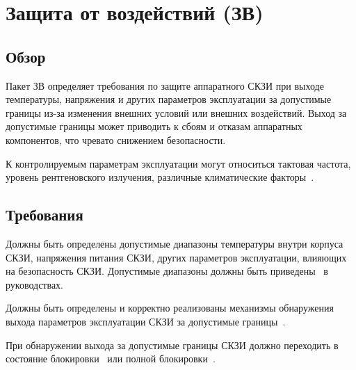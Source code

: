 \section{Защита от воздействий (ЗВ)}\label{EF}

\subsection{Обзор}\label{EF.Intro}

Пакет ЗВ определяет требования по защите аппаратного СКЗИ при выходе 
температуры, напряжения и других параметров эксплуатации за допустимые 
границы из-за изменения внешних условий или внешних воздействий.
%
Выход за допустимые границы может приводить к сбоям и отказам аппаратных 
компонентов, что чревато снижением безопасности.

К контролируемым параметрам эксплуатации могут относиться тактовая 
частота, уровень рентгеновского излучения, различные климатические 
факторы~.


\subsection{Требования}\label{EF.Reqs}

\label{R.EF.Ranges} %
Должны быть определены допустимые диапазоны температуры внутри корпуса СКЗИ,
напряжения питания СКЗИ, других параметров эксплуатации, влияющих на
безопасность СКЗИ. Допустимые диапазоны должны быть
приведены~ в руководствах.

\label{R.EF.Detect} %
Должны быть определены и корректно реализованы механизмы обнаружения выхода
параметров эксплуатации СКЗИ за допустимые границы~.

\label{R.EF.Lock} %
При обнаружении выхода за допустимые границы СКЗИ должно переходить в состояние
блокировки~ или полной
блокировки~.
